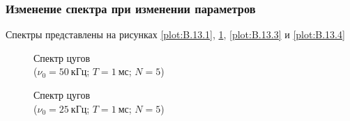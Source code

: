 \documentclass[a4paper, 12pt]{article}
\begin{document}
            \subsubsection{Изменение спектра при изменении параметров}

                Спектры представлены на рисунках \ref{plot:B.13.1}, \ref{plot:B.13.2}, \ref{plot:B.13.3} и \ref{plot:B.13.4}

                \begin{figure}[ht]
                    \begin{minipage}[ht]{0.49\linewidth}
                        \caption{Спектр цугов\\($\nu_0 = 50~кГц$; $T = 1~мс$; $N = 5$)}
                        \label{plot:B.13.1}
                    \end{minipage}
                    \begin{minipage}[ht]{0.49\linewidth}
                        \caption{Спектр цугов\\($\nu_0 = 25~кГц$; $T = 1~мс$; $N = 5$)}
                        \label{plot:B.13.2}
                    \end{minipage}
                \end{figure}
\end{document}
